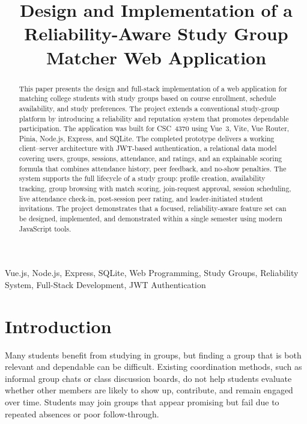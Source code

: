 \documentclass[conference]{IEEEtran}
\begin{document}
\title{Design and Implementation of a Reliability-Aware Study Group Matcher Web Application}

\author{
}

\maketitle

\begin{abstract}
This paper presents the design and full-stack implementation of a web application for matching college students with study groups based on course enrollment, schedule availability, and study preferences. The project extends a conventional study-group platform by introducing a reliability and reputation system that promotes dependable participation. The application was built for CSC~4370 using Vue~3, Vite, Vue Router, Pinia, Node.js, Express, and SQLite. The completed prototype delivers a working client--server architecture with JWT-based authentication, a relational data model covering users, groups, sessions, attendance, and ratings, and an explainable scoring formula that combines attendance history, peer feedback, and no-show penalties. The system supports the full lifecycle of a study group: profile creation, availability tracking, group browsing with match scoring, join-request approval, session scheduling, live attendance check-in, post-session peer rating, and leader-initiated student invitations. The project demonstrates that a focused, reliability-aware feature set can be designed, implemented, and demonstrated within a single semester using modern JavaScript tools.
\end{abstract}

\begin{IEEEkeywords}
Vue.js, Node.js, Express, SQLite, Web Programming, Study Groups, Reliability System, Full-Stack Development, JWT Authentication
\end{IEEEkeywords}

\section{Introduction}
Many students benefit from studying in groups, but finding a group that is both relevant and dependable can be difficult. Existing coordination methods, such as informal group chats or class discussion boards, do not help students evaluate whether other members are likely to show up, contribute, and remain engaged over time. Students may join groups that appear promising but fail due to repeated absences or poor follow-through.
\end{document}
